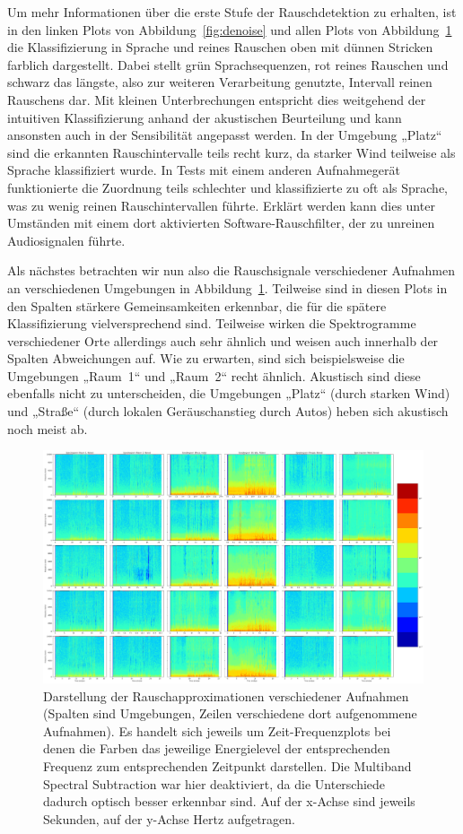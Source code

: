 \documentclass[
	fontsize=10.5pt,
	marginpar=false,
	ngerman,
	accentcolor=3d
	]{tudapub}
\begin{document}
Um mehr Informationen über die erste Stufe der Rauschdetektion zu erhalten, ist in den linken Plots von Abbildung~\ref{fig:denoise} und allen Plots von Abbildung~\ref{fig:compare} die Klassifizierung in Sprache und reines Rauschen oben mit dünnen Stricken farblich dargestellt. Dabei stellt grün Sprachsequenzen, rot reines Rauschen und schwarz das längste, also zur weiteren Verarbeitung genutzte, Intervall reinen Rauschens dar. Mit kleinen Unterbrechungen entspricht dies weitgehend der intuitiven Klassifizierung anhand der akustischen Beurteilung und kann ansonsten auch in der Sensibilität angepasst werden. In der Umgebung „Platz“ sind die erkannten Rauschintervalle teils recht kurz, da starker Wind teilweise als Sprache klassifiziert wurde. In Tests mit einem anderen Aufnahmegerät funktionierte die Zuordnung teils schlechter und klassifizierte zu oft als Sprache, was zu wenig reinen Rauschintervallen führte. Erklärt werden kann dies unter Umständen mit einem dort aktivierten Software-Rauschfilter, der zu unreinen Audiosignalen führte.

Als nächstes betrachten wir nun also die Rauschsignale verschiedener Aufnahmen an verschiedenen Umgebungen in Abbildung~\ref{fig:compare}. Teilweise sind in diesen Plots in den Spalten stärkere Gemeinsamkeiten erkennbar, die für die spätere Klassifizierung vielversprechend sind. Teilweise wirken die Spektrogramme verschiedener Orte allerdings auch sehr ähnlich und weisen auch innerhalb der Spalten Abweichungen auf. Wie zu erwarten, sind sich beispielsweise die Umgebungen „Raum~1“ und „Raum~2“ recht ähnlich. Akustisch sind diese ebenfalls nicht zu unterscheiden, die Umgebungen „Platz“ (durch starken Wind) und „Straße“ (durch lokalen Geräuschanstieg durch Autos) heben sich akustisch noch meist ab.

\begin{figure}[h]
	\centering
	\includegraphics[width=1.0\textwidth]{media/comp}
	\caption{Darstellung der Rauschapproximationen verschiedener Aufnahmen (Spalten sind Umgebungen, Zeilen verschiedene dort aufgenommene Aufnahmen). Es handelt sich jeweils um Zeit-Frequenzplots bei denen die Farben das jeweilige Energielevel der entsprechenden Frequenz zum entsprechenden Zeitpunkt darstellen. Die Multiband Spectral Subtraction war hier deaktiviert, da die Unterschiede dadurch optisch besser erkennbar sind. Auf der x-Achse sind jeweils Sekunden, auf der y-Achse Hertz aufgetragen.}
	\label{fig:compare}
\end{figure}
\end{document}
